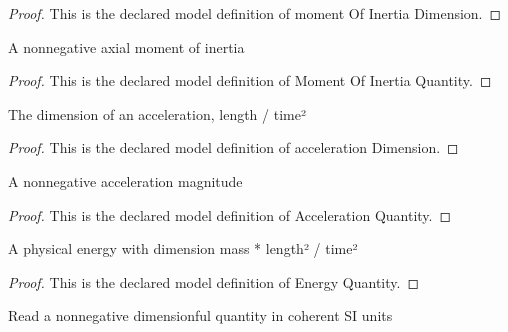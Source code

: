 \begin{proof}
  This is the declared model definition of moment Of Inertia Dimension.
\end{proof}
\begin{definition}
  \label{def:physics:phyx-mini-0787:phyxminiproblems-problemphyxmini0787-momentofinertiaquantity}
  A nonnegative axial moment of inertia
\end{definition}
\begin{proof}
  This is the declared model definition of Moment Of Inertia Quantity.
\end{proof}
\begin{definition}
  \label{def:physics:phyx-mini-0787:phyxminiproblems-problemphyxmini0787-accelerationdimension}
  The dimension of an acceleration, length / time²
\end{definition}
\begin{proof}
  This is the declared model definition of acceleration Dimension.
\end{proof}
\begin{definition}
  \label{def:physics:phyx-mini-0787:phyxminiproblems-problemphyxmini0787-accelerationquantity}
  A nonnegative acceleration magnitude
\end{definition}
\begin{proof}
  This is the declared model definition of Acceleration Quantity.
\end{proof}
\begin{definition}
  \label{def:physics:phyx-mini-0787:phyxminiproblems-problemphyxmini0787-energyquantity}
  A physical energy with dimension mass * length² / time²
\end{definition}
\begin{proof}
  This is the declared model definition of Energy Quantity.
\end{proof}
\begin{definition}
  \label{def:physics:phyx-mini-0787:phyxminiproblems-problemphyxmini0787-nonnegativesireadout}
  Read a nonnegative dimensionful quantity in coherent SI units
\end{definition}
